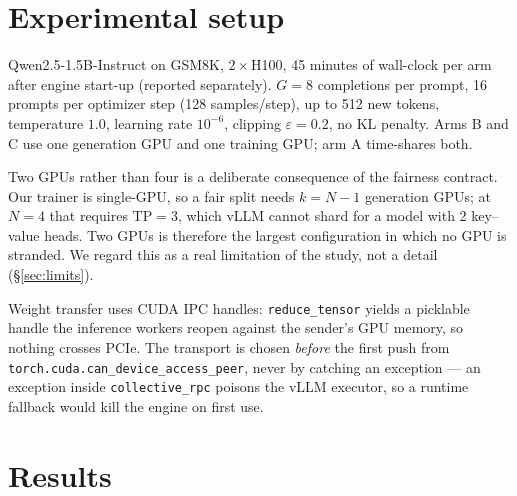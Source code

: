 \documentclass[11pt]{article}
\begin{document}
\section{Experimental setup}

Qwen2.5-1.5B-Instruct on GSM8K, $2\times$H100, 45 minutes of wall-clock per arm after engine
start-up (reported separately). $G=8$ completions per prompt, 16 prompts per optimizer step
(128 samples/step), up to 512 new tokens, temperature $1.0$, learning rate $10^{-6}$,
clipping $\varepsilon=0.2$, no KL penalty. Arms B and C use one generation GPU and one
training GPU; arm A time-shares both.

Two GPUs rather than four is a deliberate consequence of the fairness contract. Our trainer
is single-GPU, so a fair split needs $k = N-1$ generation GPUs; at $N=4$ that requires
$\mathrm{TP}=3$, which vLLM cannot shard for a model with 2 key--value heads. Two GPUs is
therefore the largest configuration in which no GPU is stranded. We regard this as a real
limitation of the study, not a detail (\S\ref{sec:limits}).

Weight transfer uses CUDA IPC handles: \texttt{reduce\_tensor} yields a picklable handle the
inference workers reopen against the sender's GPU memory, so nothing crosses PCIe. The
transport is chosen \emph{before} the first push from
\texttt{torch.cuda.can\_device\_access\_peer}, never by catching an exception --- an exception
inside \texttt{collective\_rpc} poisons the vLLM executor, so a runtime fallback would kill
the engine on first use.

\section{Results}\label{sec:results}
\end{document}
